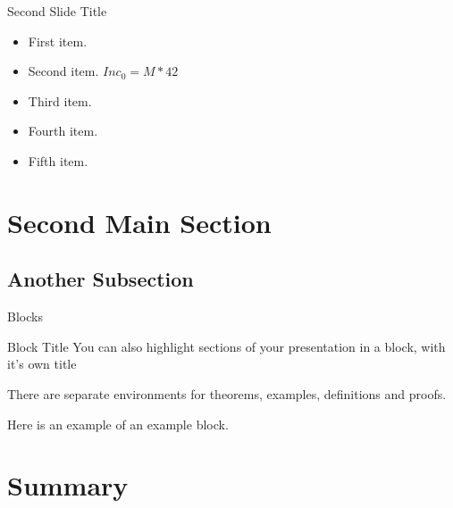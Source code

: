 \documentclass{beamer}
\begin{document}
\begin{frame}{Second Slide Title}
    \begin{itemize}
        \item {First item.
            \pause %
        }
        \item {Second item. $Inc_{0} = M * 42$}
  \item<3-> {Third item.}
  \item<4-> {Fourth item.}
  \item<5-> {Fifth item. }
  \end{itemize}
\end{frame}

\section{Second Main Section}

\subsection{Another Subsection}

\begin{frame}{Blocks}
\begin{block}{Block Title}
You can also highlight sections of your presentation in a block, with it's own title
\end{block}
\begin{theorem}
There are separate environments for theorems, examples, definitions and proofs.
\end{theorem}
\begin{example}
Here is an example of an example block.
\end{example}
\end{frame}

\section*{Summary}
\end{document}

